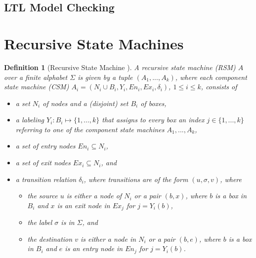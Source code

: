 \documentclass[a4paper, 12pt, twoside]{report}
\theoremstyle{plain}
\newtheorem{definition}[theorem]{Definition}
\begin{document}
	
	\subsection{LTL Model Checking}
	
	\section{Recursive State Machines} 
		\begin{definition}[Recursive State Machine \cite{alur2001analysis}]\label{def:rsm}
			A \textup{recursive state machine} (RSM) $A$ over a finite alphabet $\Sigma$ is given by a tuple $(A_1, ..., A_k)$, where each \textup{component state machine} (CSM) $A_i = (N_i \cup B_i, Y_i, En_i, Ex_i, \delta_i)$, $1 \leq i \leq k$, consists of
			\begin{itemize}
				\item a set $N_i$ of \textup{nodes} and a (disjoint) set $B_i$ of \textup{boxes},
				\item a \textup{labeling} $Y_i: B_i \mapsto \{1, ..., k\}$ that assigns to every box an index $j \in \{1, ..., k\}$ referring to one of the component state machines $A_1, ..., A_k$,
				\item a set of \textup{entry nodes} $En_i \subseteq N_i$,
				\item a set of \textup{exit nodes} $Ex_i \subseteq N_i$, and
				\item a \textup{transition relatio}n $\delta_i$, where transitions are of the form $(u, \sigma, v)$, where 
				\begin{itemize}
					\item the source $u$ is either a node of $N_i$ or a pair $(b, x)$, where $b$ is a box in $B_i$ and $x$ is an exit node in $Ex_j$ for $j = Y_i(b)$,
					\item the label $\sigma$ is in $\Sigma$, and 
					\item the destination $v$ is either a node in $N_i$ or a pair $(b, e)$, where $b$ is a box in $B_i$ and $e$ is an entry node in $En_j$ for $j = Y_i(b)$.
				\end{itemize}
			\end{itemize}
		\end{definition}
	
	
\end{document}
